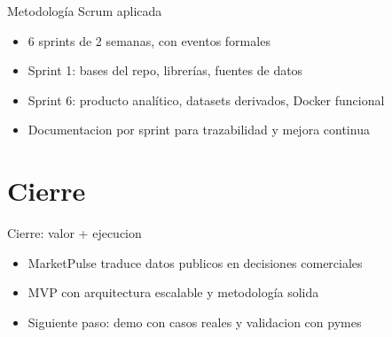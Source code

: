 \documentclass[aspectratio=169]{beamer}
\begin{document}
\begin{frame}{Metodolog\'ia Scrum aplicada}
  \begin{itemize}
    \item 6 sprints de 2 semanas, con eventos formales
    \item Sprint 1: bases del repo, librer\'ias, fuentes de datos
    \item Sprint 6: producto anal\'itico, datasets derivados, Docker funcional
    \item Documentacion por sprint para trazabilidad y mejora continua
  \end{itemize}
\end{frame}

\section{Cierre}

\begin{frame}{Cierre: valor + ejecucion}
  \begin{itemize}
    \item MarketPulse traduce datos publicos en decisiones comerciales
    \item MVP con arquitectura escalable y metodolog\'ia solida
    \item Siguiente paso: demo con casos reales y validacion con pymes
  \end{itemize}
\end{frame}
\end{document}
